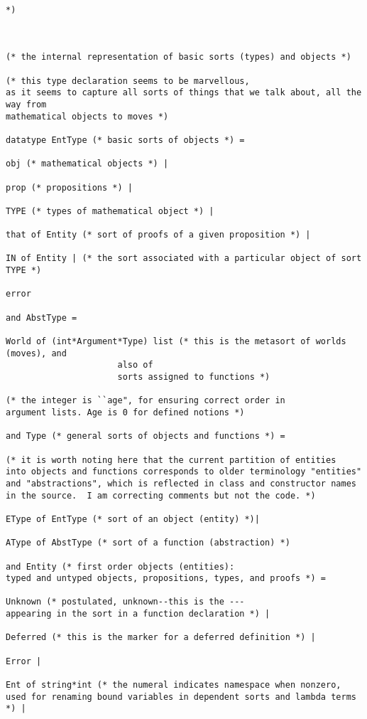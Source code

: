 \documentclass{article}
\begin{document}
\begin{verbatim}

*)



(* the internal representation of basic sorts (types) and objects *)

(* this type declaration seems to be marvellous, 
as it seems to capture all sorts of things that we talk about, all the way from
mathematical objects to moves *)

datatype EntType (* basic sorts of objects *) =

obj (* mathematical objects *) |

prop (* propositions *) |

TYPE (* types of mathematical object *) |

that of Entity (* sort of proofs of a given proposition *) |

IN of Entity | (* the sort associated with a particular object of sort TYPE *)

error

and AbstType =

World of (int*Argument*Type) list (* this is the metasort of worlds (moves), and    
                      also of
                      sorts assigned to functions *)

(* the integer is ``age", for ensuring correct order in
argument lists. Age is 0 for defined notions *)

and Type (* general sorts of objects and functions *) =

(* it is worth noting here that the current partition of entities
into objects and functions corresponds to older terminology "entities"
and "abstractions", which is reflected in class and constructor names
in the source.  I am correcting comments but not the code. *)

EType of EntType (* sort of an object (entity) *)|

AType of AbstType (* sort of a function (abstraction) *)

and Entity (* first order objects (entities): 
typed and untyped objects, propositions, types, and proofs *) = 

Unknown (* postulated, unknown--this is the --- 
appearing in the sort in a function declaration *) |

Deferred (* this is the marker for a deferred definition *) |

Error |

Ent of string*int (* the numeral indicates namespace when nonzero, 
used for renaming bound variables in dependent sorts and lambda terms *) |


\end{verbatim}
\end{document}
